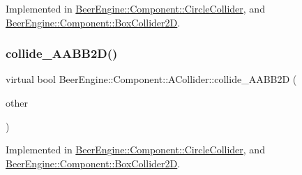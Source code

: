 Implemented in \mbox{\hyperlink{class_beer_engine_1_1_component_1_1_circle_collider_a7443f2cadac6ae282025a6757ad2b3c8}{Beer\+Engine\+::\+Component\+::\+Circle\+Collider}}, and \mbox{\hyperlink{class_beer_engine_1_1_component_1_1_box_collider2_d_aeaac56770926a57af78e7af0379c30ca}{Beer\+Engine\+::\+Component\+::\+Box\+Collider2D}}.

\mbox{\label{class_beer_engine_1_1_component_1_1_a_collider_ab9acc12bf6017b81f3515264238ce3d5}} 
\subsubsection{\texorpdfstring{collide\+\_\+\+A\+A\+B\+B2\+D()}{collide\_AABB2D()}\hspace{0.1cm}{\footnotesize\ttfamily [1/2]}}
{\footnotesize\ttfamily virtual bool Beer\+Engine\+::\+Component\+::\+A\+Collider\+::collide\+\_\+\+A\+A\+B\+B2D (\begin{DoxyParamCaption}\item[{\mbox{\hyperlink{class_beer_engine_1_1_component_1_1_circle_collider}{Circle\+Collider}} $\ast$}]{other }\end{DoxyParamCaption})\hspace{0.3cm}{\ttfamily [pure virtual]}}



Implemented in \mbox{\hyperlink{class_beer_engine_1_1_component_1_1_circle_collider_a20e45eaf7bb9ca22573e0fda117ae274}{Beer\+Engine\+::\+Component\+::\+Circle\+Collider}}, and \mbox{\hyperlink{class_beer_engine_1_1_component_1_1_box_collider2_d_a36f2e8987bd65106250ca6eea7003e1b}{Beer\+Engine\+::\+Component\+::\+Box\+Collider2D}}.

\mbox{\label{class_beer_engine_1_1_component_1_1_a_collider_ae972d39620da804c72fb9799c167bf4b}} 
